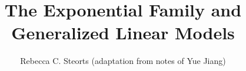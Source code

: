 \documentclass{beamer}
\title{The Exponential Family and \\ Generalized Linear Models}
\author{Rebecca C. Steorts (adaptation from notes of Yue Jiang)}
\begin{document}
\begin{frame}
  \titlepage
\end{frame}


%
%
\end{document}
